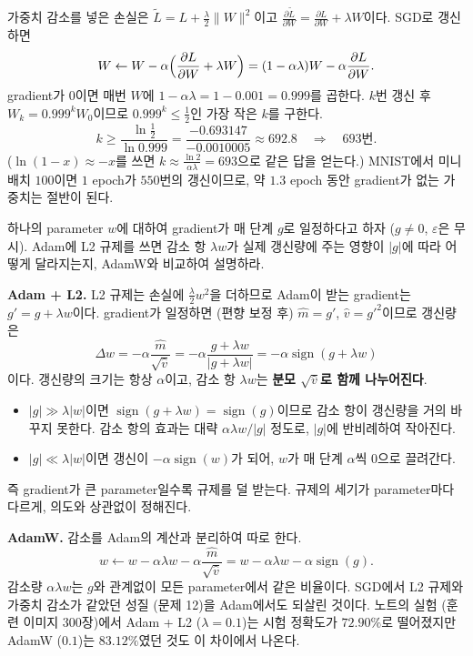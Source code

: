 \documentclass[11pt,a4paper]{article}
\newcommand{\pd}[2]{\frac{\partial #1}{\partial #2}}
\begin{document}
\begin{problems}
\begin{sol}
가중치 감소를 넣은 손실은 $\tilde L=L+\frac\lambda2\|W\|^2$이고 $\pd{\tilde L}{W}=\pd{L}{W}+\lambda W$이다. SGD로 갱신하면
\[
W\leftarrow W-\alpha\Bigl(\pd{L}{W}+\lambda W\Bigr)=(1-\alpha\lambda)W-\alpha\pd{L}{W}.
\]
gradient가 $0$이면 매번 $W$에 $1-\alpha\lambda=1-0.001=0.999$를 곱한다.
$k$번 갱신 후 $W_k=0.999^kW_0$이므로 $0.999^k\le\frac12$인 가장 작은 $k$를 구한다.
\[
k\ge\frac{\ln\frac12}{\ln0.999}=\frac{-0.693147}{-0.0010005}\approx692.8
\quad\Longrightarrow\quad\boxed{693\text{번}}.
\]
($\ln(1-x)\approx-x$를 쓰면 $k\approx\frac{\ln2}{\alpha\lambda}=693$으로 같은 답을 얻는다.)
MNIST에서 미니배치 $100$이면 $1$ epoch가 $550$번의 갱신이므로, 약 $1.3$ epoch 동안 gradient가 없는 가중치는 절반이 된다.
\end{sol}

\item 하나의 parameter $w$에 대하여 gradient가 매 단계 $g$로 일정하다고 하자 ($g\neq0$, $\varepsilon$은 무시).
Adam에 L2 규제를 쓰면 감소 항 $\lambda w$가 실제 갱신량에 주는 영향이 $|g|$에 따라 어떻게 달라지는지,
AdamW와 비교하여 설명하라.

\begin{sol}
\textbf{Adam + L2.} L2 규제는 손실에 $\frac\lambda2w^2$을 더하므로 Adam이 받는 gradient는 $g'=g+\lambda w$이다.
gradient가 일정하면 (편향 보정 후) $\hat m=g'$, $\hat v=g'^2$이므로 갱신량은
\[
\Delta w=-\alpha\frac{\hat m}{\sqrt{\hat v}}=-\alpha\frac{g+\lambda w}{|g+\lambda w|}=-\alpha\operatorname{sign}(g+\lambda w)
\]
이다. 갱신량의 크기는 항상 $\alpha$이고, 감소 항 $\lambda w$는 \textbf{분모 $\sqrt{\hat v}$로 함께 나누어진다}.
\begin{itemize}[leftmargin=1.5em,itemsep=2pt]
\item $|g|\gg\lambda|w|$이면 $\operatorname{sign}(g+\lambda w)=\operatorname{sign}(g)$이므로 감소 항이 갱신량을 거의 바꾸지 못한다.
감소 항의 효과는 대략 $\alpha\lambda w/|g|$ 정도로, $|g|$에 반비례하여 작아진다.
\item $|g|\ll\lambda|w|$이면 갱신이 $-\alpha\operatorname{sign}(w)$가 되어, $w$가 매 단계 $\alpha$씩 $0$으로 끌려간다.
\end{itemize}
즉 gradient가 큰 parameter일수록 규제를 덜 받는다. 규제의 세기가 parameter마다 다르게, 의도와 상관없이 정해진다.

\textbf{AdamW.} 감소를 Adam의 계산과 분리하여 따로 한다.
\[
w\leftarrow w-\alpha\lambda w-\alpha\frac{\hat m}{\sqrt{\hat v}}=w-\alpha\lambda w-\alpha\operatorname{sign}(g).
\]
감소량 $\alpha\lambda w$는 $g$와 관계없이 모든 parameter에서 같은 비율이다.
SGD에서 L2 규제와 가중치 감소가 같았던 성질 (문제 12)을 Adam에서도 되살린 것이다.
노트의 실험 (훈련 이미지 $300$장)에서 Adam + L2 ($\lambda=0.1$)는 시험 정확도가 $72.90\%$로 떨어졌지만 AdamW ($0.1$)는 $83.12\%$였던 것도 이 차이에서 나온다.
\end{sol}


\end{problems}
\end{document}
